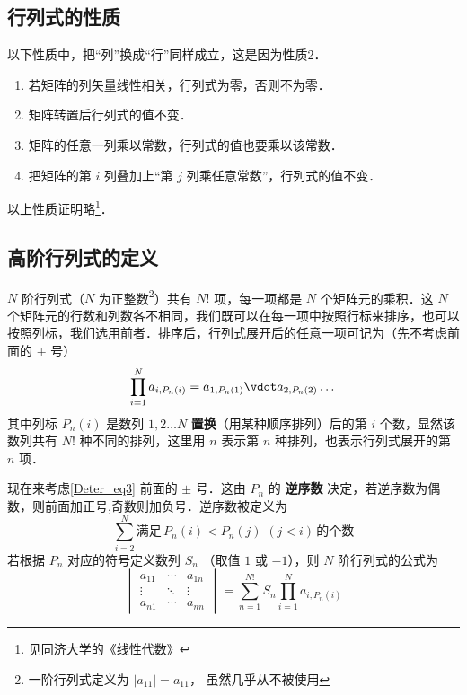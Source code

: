 \subsection{行列式的性质}
以下性质中，把“列”换成“行”同样成立，这是因为性质2．
\begin{enumerate}
\item 若矩阵的列矢量线性相关，行列式为零，否则不为零．
\item 矩阵转置后行列式的值不变． %
\item 矩阵的任意一列乘以常数，行列式的值也要乘以该常数．
\item 把矩阵的第 $i$ 列叠加上“第 $j$ 列乘任意常数”，行列式的值不变．

\end{enumerate}
以上性质证明略\footnote{见同济大学的《线性代数》}．

\subsection{高阶行列式的定义}
$N$ 阶行列式（$N$ 为正整数\footnote{一阶行列式定义为 $|a_{11}|=a_{11}$， 虽然几乎从不被使用}）共有 $N!$ 项，每一项都是 $N$ 个矩阵元的乘积．这 $N$ 个矩阵元的行数和列数各不相同，我们既可以在每一项中按照行标来排序，也可以按照列标，我们选用前者．排序后，行列式展开后的任意一项可记为（先不考虑前面的 $\pm$ 号）
\begin{equation}\label{Deter_eq3}
\prod_{i=1}^N a_{i,P_n(i)} = 
a_{1,P_n(1)} \vdot a_{2,P_n(2)} \dots
\end{equation}
其中列标 ${P_n}(i)$ 是数列 $1,2 \dots N$ \textbf{置换}（用某种顺序排列）后的第 $i$ 个数，显然该数列共有 $N!$ 种不同的排列，这里用 $n$ 表示第 $n$ 种排列，也表示行列式展开的第 $n$ 项．

现在来考虑\autoref{Deter_eq3} 前面的 $\pm$ 号．这由 $P_n$ 的 \textbf{逆序数} 决定，若逆序数为偶数，则前面加正号,奇数则加负号．逆序数被定义为
\begin{equation}
\sum_{i=2}^N \text{满足}\, P_n(i) < P_n(j) \,\, (j<i) \,\text{的个数} 
\end{equation}
若根据 $P_n$ 对应的符号定义数列 $S_n$ （取值 $1$ 或 $-1$），则 $N$ 阶行列式的公式为
\begin{equation}
\begin{vmatrix}
a_{11} & \cdots & a_{1n} \\
\vdots & \ddots & \vdots \\
a_{n1} & \cdots & a_{nn}
\end{vmatrix}
= \sum_{n=1}^{N!} S_n \prod_{i=1}^N a_{i,P_n(i)}
\end{equation}


